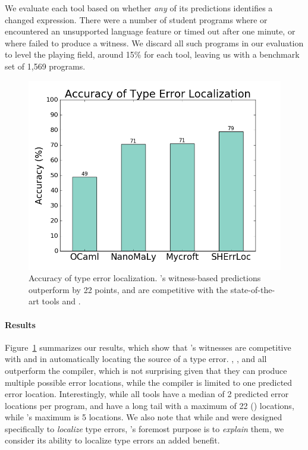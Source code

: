 We evaluate each tool based on whether \emph{any} of its predictions
identifies a changed expression.
%
There were a number of student programs where \mycroft or \sherrloc
encountered an unsupported language feature or timed out after one
minute, or where \toolname failed to produce a witness.
%
We discard all such programs in our evaluation to level the playing
field, around 15\% for each tool, leaving us with a benchmark set of
1,569 programs.

\begin{figure}[t]
\includegraphics[width=0.7\linewidth]{blame.png}
\caption{Accuracy of type error localization. \toolname's witness-based
  predictions outperform \ocaml by 22 points, and are competitive
  with the state-of-the-art tools \mycroft and \sherrloc.}
\label{fig:results-blame}
\end{figure}

\paragraph{Results}
Figure~\ref{fig:results-blame} summarizes our results, which show that
\toolname's witnesses are competitive with \mycroft and \sherrloc in
automatically locating the source of a type error.
%
\toolname, \mycroft, and \sherrloc all outperform the \ocaml compiler,
which is not surprising given that they can produce multiple possible
error locations, while the \ocaml compiler is limited to one predicted
error location.
%
Interestingly, while all tools have a median of 2 predicted error
locations per program, \mycroft and \sherrloc have a long tail with a
maximum of 22 () locations, while \toolname's maximum is 5
locations.
%
We also note that while \mycroft and \sherrloc were designed
specifically to \emph{localize} type errors, \toolname's foremost
purpose is to \emph{explain} them, we consider its ability to localize
type errors an added benefit.

